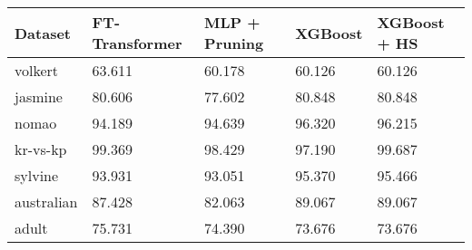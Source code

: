 \begin{tabular}{lllll}
\toprule
Dataset & FT-Transformer & MLP + Pruning & XGBoost & XGBoost + HS \\
\midrule
volkert & 63.611 & 60.178 & 60.126 & 60.126 \\
jasmine & 80.606 & 77.602 & 80.848 & 80.848 \\
nomao & 94.189 & 94.639 & 96.320 & 96.215 \\
kr-vs-kp & 99.369 & 98.429 & 97.190 & 99.687 \\
sylvine & 93.931 & 93.051 & 95.370 & 95.466 \\
australian & 87.428 & 82.063 & 89.067 & 89.067 \\
adult & 75.731 & 74.390 & 73.676 & 73.676 \\
\bottomrule
\end{tabular}
